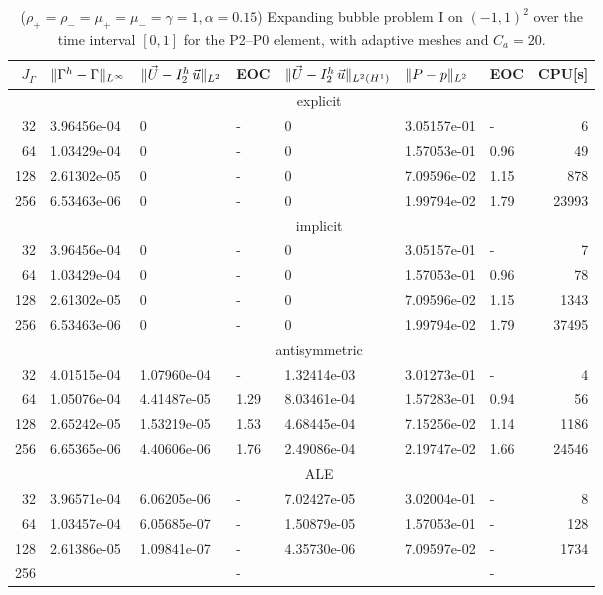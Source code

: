 \begin{table}
\center
\hspace*{-3.25cm}
\begin{tabular}{rllllllr}
\hline
$J_\Gamma$ & $\|\Gamma^h - \Gamma\|_{L^\infty}$ & $\|\vec U - I^h_{2}\,\vec u\|_{L^2}$ & EOC & $\|\vec U - I^h_{2}\,\vec u\|_{L^2(H^1)}$ & $\|P - p\|_{L^2}$ & EOC
& CPU[s] \\
\hline
& \multicolumn{7}{c}{explicit} \\
\hline
 32 & 3.96456e-04 & 0 & - & 0 & 3.05157e-01 &    - &     6 \\
 64 & 1.03429e-04 & 0 & - & 0 & 1.57053e-01 & 0.96 &    49 \\
128 & 2.61302e-05 & 0 & - & 0 & 7.09596e-02 & 1.15 &   878 \\
256 & 6.53463e-06 & 0 & - & 0 & 1.99794e-02 & 1.79 & 23993 \\
\hline
& \multicolumn{7}{c}{implicit} \\
\hline
 32 & 3.96456e-04 & 0 & - & 0 & 3.05157e-01 &    - &     7 \\
 64 & 1.03429e-04 & 0 & - & 0 & 1.57053e-01 & 0.96 &    78 \\
128 & 2.61302e-05 & 0 & - & 0 & 7.09596e-02 & 1.15 &  1343 \\
256 & 6.53463e-06 & 0 & - & 0 & 1.99794e-02 & 1.79 & 37495 \\
\hline
& \multicolumn{7}{c}{antisymmetric} \\
\hline
 32 & 4.01515e-04 & 1.07960e-04 &    - & 1.32414e-03 & 3.01273e-01 &    - &
4 \\
 64 & 1.05076e-04 & 4.41487e-05 & 1.29 & 8.03461e-04 & 1.57283e-01 & 0.94 &
56 \\
128 & 2.65242e-05 & 1.53219e-05 & 1.53 & 4.68445e-04 & 7.15256e-02 & 1.14 &
1186 \\
256 & 6.65365e-06 & 4.40606e-06 & 1.76 & 2.49086e-04 & 2.19747e-02 & 1.66 &
24546 \\
\hline
& \multicolumn{7}{c}{ALE} \\
\hline
 32 & 3.96571e-04 & 6.06205e-06 &    - & 7.02427e-05 & 3.02004e-01 &    - &
8 \\
 64 & 1.03457e-04 & 6.05685e-07 &    - & 1.50879e-05 & 1.57053e-01 &    - &
128 \\
128 & 2.61386e-05 & 1.09841e-07 &    - & 4.35730e-06 & 7.09597e-02 &    - &
1734 \\
256 & & &    - & & &    - & \\
\hline
\end{tabular}
\hspace*{-3.25cm}
\caption[Navier--Stokes expanding bubble I errors P2--P0]
{($\rho_+ = \rho_- = \mu_+ = \mu_- = \gamma = 1,\alpha=0.15$)
Expanding bubble problem I on $(-1,1)^2$ over the time interval $[0,1]$ for the
P2--P0 element, with adaptive meshes and $C_a=20$\textdegree.}
\label{tab:nsexpandingbubbleIp2p0}
\end{table}

